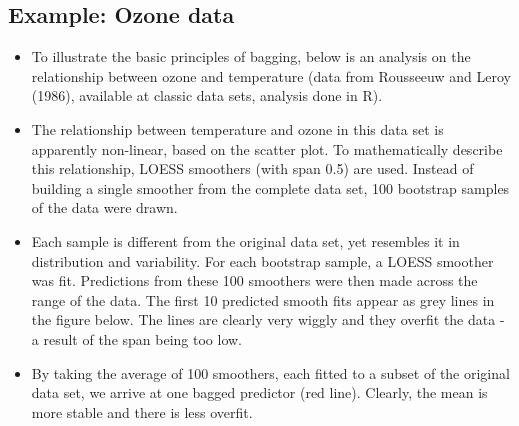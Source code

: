 \documentclass[a4paper,12pt]{article}
\begin{document}
\subsection*{Example: Ozone data}
\begin{itemize}
    \item To illustrate the basic principles of bagging, below is an analysis on the relationship between ozone and temperature (data from Rousseeuw and Leroy (1986), available at classic data sets, analysis done in R).

    \item  The relationship between temperature and ozone in this data set is apparently non-linear, based on the scatter plot. To mathematically describe this relationship, LOESS smoothers (with span 0.5) are used. Instead of building a single smoother from the complete data set, 100 bootstrap samples of the data were drawn. 

    \item  Each sample is different from the original data set, yet resembles it in distribution and variability. For each bootstrap sample, a LOESS smoother was fit. Predictions from these 100 smoothers were then made across the range of the data. The first 10 predicted smooth fits appear as grey lines in the figure below. The lines are clearly very wiggly and they overfit the data - a result of the span being too low.


    \item  By taking the average of 100 smoothers, each fitted to a subset of the original data set, we arrive at one bagged predictor (red line). Clearly, the mean is more stable and there is less overfit.
\end{itemize}
\end{document}
